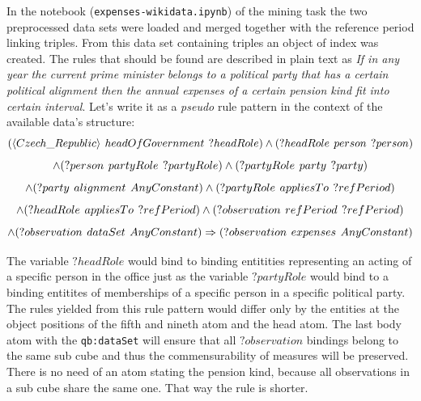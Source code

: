 In the notebook (\verb|expenses-wikidata.ipynb|) of the mining task the two preprocessed data sets were loaded and merged together with the reference period linking triples. From this data set containing  triples an object of index was created. The rules that should be found are described in plain text as \textit{If in any year the current prime minister belongs to a political party that has a certain political alignment then the annual expenses of a certain pension kind fit into certain interval}. Let's write it as a \textit{pseudo} rule pattern in the context of the available data's structure:
$$
(\langle Czech\_Republic\rangle\hspace{0.4em}headOfGovernment\hspace{0.4em}?headRole) \land (?headRole\hspace{0.4em}person\hspace{0.4em}?person)
$$
$$
\land (?person\hspace{0.4em}partyRole\hspace{0.4em}?partyRole) \land (?partyRole\hspace{0.4em}party\hspace{0.4em}?party)
$$
$$
\land (?party\hspace{0.4em}alignment\hspace{0.4em}AnyConstant) \land (?partyRole\hspace{0.4em}appliesTo\hspace{0.4em}?refPeriod)
$$
$$
\land (?headRole\hspace{0.4em}appliesTo\hspace{0.4em}?refPeriod) \land (?observation\hspace{0.4em}refPeriod\hspace{0.4em}?refPeriod)
$$
$$
\land (?observation\hspace{0.4em}dataSet\hspace{0.4em}AnyConstant) \Rightarrow (?observation\hspace{0.4em}expenses\hspace{0.4em}AnyConstant)
$$

The variable $?headRole$ would bind to binding entitities representing an acting of a specific person in the office just as the variable $?partyRole$ would bind to a binding entitites of memberships of a specific person in a specific political party. The rules yielded from this rule pattern would differ only by the entities at the object positions of the fifth and nineth atom and the head atom. The last body atom with the \verb|qb:dataSet| will ensure that all $?observation$ bindings belong to the same sub cube and thus the commensurability of measures will be preserved. There is no need of an atom stating the pension kind, because all observations in a sub cube share the same one. That way the rule is shorter.

